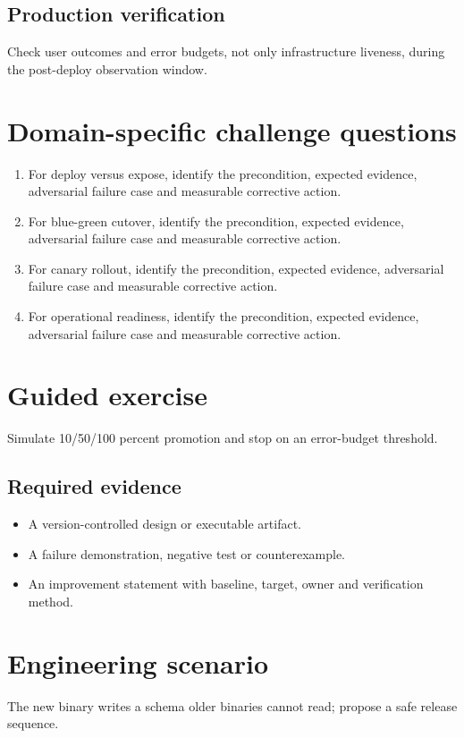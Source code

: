 \documentclass[10pt,letterpaper]{article}
\begin{document}
\subsection{Production verification}
Check user outcomes and error budgets, not only infrastructure liveness, during the post-deploy observation window.

\section{Domain-specific challenge questions}
\begin{enumerate}
\item For deploy versus expose, identify the precondition, expected evidence, adversarial failure case and measurable corrective action.
\item For blue-green cutover, identify the precondition, expected evidence, adversarial failure case and measurable corrective action.
\item For canary rollout, identify the precondition, expected evidence, adversarial failure case and measurable corrective action.
\item For operational readiness, identify the precondition, expected evidence, adversarial failure case and measurable corrective action.
\end{enumerate}
\section{Guided exercise}
Simulate 10/50/100 percent promotion and stop on an error-budget threshold.

\subsection{Required evidence}
\begin{itemize}
\item A version-controlled design or executable artifact.
\item A failure demonstration, negative test or counterexample.
\item An improvement statement with baseline, target, owner and verification method.
\end{itemize}


\section{Engineering scenario}
The new binary writes a schema older binaries cannot read; propose a safe release sequence.
\end{document}
